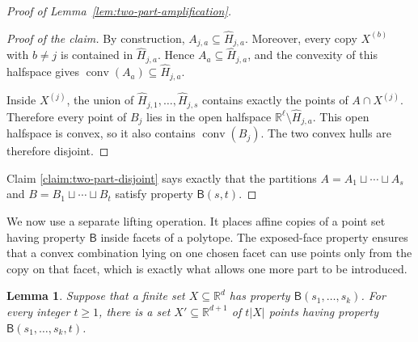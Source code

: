 \documentclass[11pt]{article}
\newtheorem{lemma}[theorem]{Lemma}
\theoremstyle{definition}
\newenvironment{poc}{\begin{proof}[Proof of the claim]\renewcommand*{\qedsymbol}{\(\blacksquare\)}}{\end{proof}}
\newcommand*{\abs}[1]{\lvert#1\rvert}
\newcommand{\R}{\mathbb{R}}
\begin{document}
\begin{proof}[Proof of Lemma~\ref{lem:two-part-amplification}]
\begin{poc}
By construction, \(A_{j,a}\subseteq\widehat H_{j,a}\). Moreover, every copy \(X^{(b)}\) with \(b\ne j\) is contained in \(\widehat H_{j,a}\). Hence \(A_{a}\subseteq\widehat H_{j,a}\), and the convexity of this halfspace gives \(\operatorname{conv}(A_{a})\subseteq\widehat H_{j,a}\).

Inside \(X^{(j)}\), the union of \(\widehat H_{j,1},\ldots,\widehat H_{j,s}\) contains exactly the points of \(A\cap X^{(j)}\). Therefore every point of \(B_{j}\) lies in the open halfspace \(\R^{\ell}\setminus\widehat H_{j,a}\). This open halfspace is convex, so it also contains \(\operatorname{conv}(B_{j})\). The two convex hulls are therefore disjoint.
\end{poc}

Claim \ref{claim:two-part-disjoint} says exactly that the partitions \(A=A_{1}\sqcup\cdots\sqcup A_{s}\) and \(B=B_{1}\sqcup\cdots\sqcup B_{t}\) satisfy property \(\mathsf{B}(s,t)\).
\end{proof}

We now use a separate lifting operation. It places affine copies of a point set having property \(\mathsf{B}\) inside facets of a polytope. The exposed-face property ensures that a convex combination lying on one chosen facet can use points only from the copy on that facet, which is exactly what allows one more part to be introduced.

\begin{lemma}\label{lem:facet-lifting}
Suppose that a finite set \(X\subseteq\R^{d}\) has property \(\mathsf{B}(s_{1},\ldots,s_{k})\). For every integer \(t\ge1\), there is a set \(X'\subseteq\R^{d+1}\) of \(t\abs{X}\) points having property \(\mathsf{B}(s_{1},\ldots,s_{k},t)\).
\end{lemma}
\end{document}
